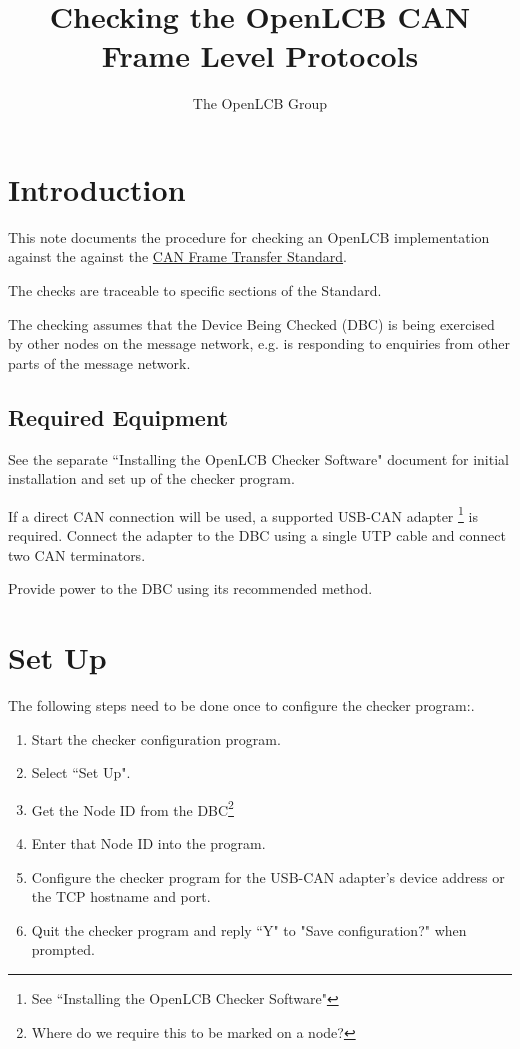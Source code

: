 \documentclass[11pt]{article}
\title{Checking the OpenLCB CAN Frame Level Protocols}
\author{The OpenLCB Group}
\begin{document}
\maketitle


\section{Introduction}

This note documents the procedure for checking an OpenLCB implementation against the 
against the
\href{https://nbviewer.org/github/openlcb/documents/blob/master/standards/CanFrameTransferS.pdf}{CAN Frame Transfer Standard}.

The checks are traceable to specific sections of the Standard.

The checking assumes that the Device Being Checked (DBC) is being exercised by other
nodes on the message network, 
e.g. is responding to enquiries from other parts of the message network.

\subsection{Required Equipment}

See the separate ``Installing the OpenLCB Checker Software" document for initial installation 
and set up of the checker program.

If a direct CAN connection will be used,
a supported USB-CAN adapter
    \footnote{See ``Installing the OpenLCB Checker Software"}
is required. 
Connect the adapter to the DBC using a single UTP cable and connect two CAN terminators.

Provide power to the DBC using its recommended method.

\section{Set Up}
The following steps need to be done once to configure the checker program:.
\begin{enumerate}
\item Start the checker configuration program. 
\item Select ``Set Up".
\item Get the Node ID from the DBC\footnote{Where do we require this to be marked on a node?} 
\item Enter that Node ID into the program.
\item Configure the checker program for the USB-CAN adapter's device address
        or the TCP hostname and port.
\item Quit the checker program and reply ``Y" to "Save configuration?" when prompted.
\end{enumerate}
\end{document}
